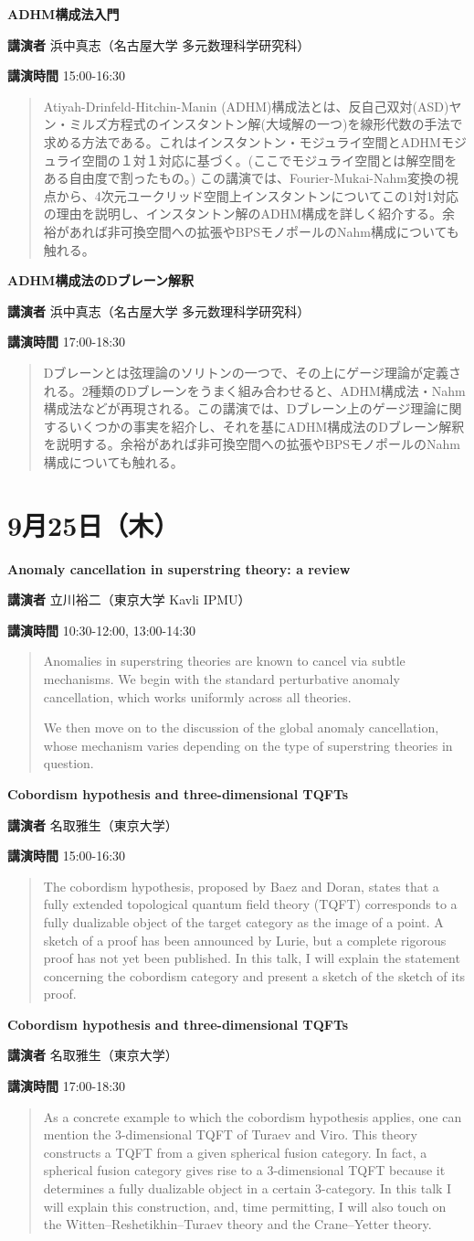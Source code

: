 \documentclass{ltjsarticle}
\theoremstyle{mystyle} %
\numberwithin{equation}{section}
\newcommand{\spkB}{浜中真志}
\newcommand{\spkC}{立川裕二}
\newcommand{\spkD}{名取雅生}
\newcommand{\instB}{名古屋大学 多元数理科学研究科}
\newcommand{\instC}{東京大学 Kavli IPMU}
\newcommand{\instD}{東京大学}
\newcommand{\titleB}{ADHM構成法入門}
\newcommand{\titleBB}{ADHM構成法のDブレーン解釈}
\newcommand{\titleC}{Anomaly cancellation in superstring theory: a review}
\newcommand{\titleD}{Cobordism hypothesis and three-dimensional TQFTs}
\newcommand{\abst}[5]{
    \Large
    \textbf{#1}
    \normalsize
    
    \vspace{10pt}

    \textbf{講演者} #2（#3）

    \textbf{講演時間} #4

    \vspace{5pt}

    \begin{quote}
        #5
    \end{quote}

    \vspace{10pt}
}
\begin{document}
\abst{\titleB}{\spkB}{\instB}{15:00-16:30}{
    Atiyah-Drinfeld-Hitchin-Manin (ADHM)構成法とは、反自己双対(ASD)ヤン・ミルズ方程式のインスタントン解(大域解の一つ)を線形代数の手法で求める方法である。これはインスタントン・モジュライ空間とADHMモジュライ空間の１対１対応に基づく。(ここでモジュライ空間とは解空間をある自由度で割ったもの。) この講演では、Fourier-Mukai-Nahm変換の視点から、4次元ユークリッド空間上インスタントンについてこの1対1対応の理由を説明し、インスタントン解のADHM構成を詳しく紹介する。余裕があれば非可換空間への拡張やBPSモノポールのNahm構成についても触れる。
}

\abst{\titleBB}{\spkB}{\instB}{17:00-18:30}{
    Dブレーンとは弦理論のソリトンの一つで、その上にゲージ理論が定義される。2種類のDブレーンをうまく組み合わせると、ADHM構成法・Nahm構成法などが再現される。この講演では、Dブレーン上のゲージ理論に関するいくつかの事実を紹介し、それを基にADHM構成法のDブレーン解釈を説明する。余裕があれば非可換空間への拡張やBPSモノポールのNahm構成についても触れる。
}

\newpage

\section*{9月25日（木）}

\abst{\titleC}{\spkC}{\instC}{10:30-12:00, 13:00-14:30}{
    Anomalies in superstring theories are known to cancel via subtle mechanisms. We begin with the standard perturbative anomaly cancellation, which works uniformly across all theories. \\\relax
    
    We then move on to the discussion of the global anomaly cancellation, whose mechanism varies depending on the type of superstring theories in question.
}

\abst{\titleD}{\spkD}{\instD}{15:00-16:30}{
    The cobordism hypothesis, proposed by Baez and Doran, states that a fully extended topological quantum field theory (TQFT) corresponds to a fully dualizable object of the target category as the image of a point. A sketch of a proof has been announced by Lurie, but a complete rigorous proof has not yet been published. In this talk, I will explain the statement concerning the cobordism category and present a sketch of the sketch of its proof.
}

\abst{\titleD}{\spkD}{\instD}{17:00-18:30}{
    As a concrete example to which the cobordism hypothesis applies, one can mention the 3-dimensional TQFT of Turaev and Viro. This theory constructs a TQFT from a given spherical fusion category. In fact, a spherical fusion category gives rise to a 3-dimensional TQFT because it determines a fully dualizable object in a certain 3-category. In this talk I will explain this construction, and, time permitting, I will also touch on the Witten–Reshetikhin–Turaev theory and the Crane–Yetter theory.
}
\end{document}
